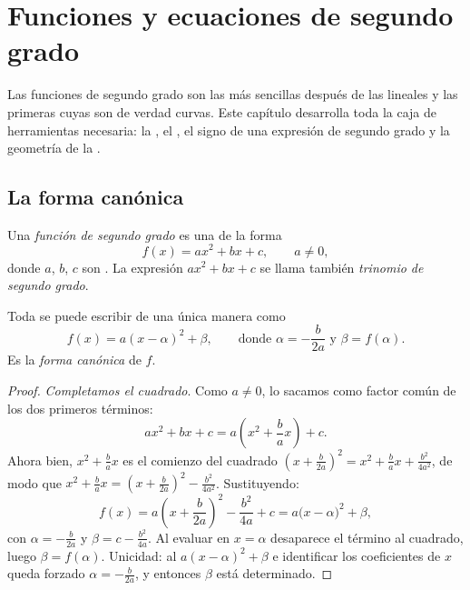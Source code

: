\chapter{Funciones y ecuaciones de segundo grado}\label{ch:g11:quad}

Las funciones de segundo grado son las más sencillas después de las
lineales y las primeras cuyas  son de verdad curvas. Este capítulo
desarrolla toda la caja de herramientas necesaria: la , el
, el signo de una expresión de segundo grado y la geometría
de la .

\section{La forma canónica}

\begin{definition}\label{def:g11:quad:quadratic}
Una \emph{función de segundo grado} es una
 de la forma
\[
f(x) = ax^2 + bx + c, \qquad a \neq 0,
\]
donde $a$, $b$, $c$ son . La expresión $ax^2 + bx + c$ se
llama también \emph{trinomio de segundo grado}.
\end{definition}

\begin{theorem}\label{thm:g11:quad:canonical}
Toda  se puede escribir de una única manera como
\[
f(x) = a(x - \alpha)^2 + \beta,
\qquad\text{donde } \alpha = -\frac{b}{2a} \text{ y } \beta = f(\alpha).
\]
Es la \emph{forma canónica} de $f$.
\end{theorem}

\begin{proof}
\emph{Completamos el cuadrado}. Como $a \neq 0$, lo sacamos como factor
común de los dos primeros términos:
\[
ax^2 + bx + c = a\left(x^2 + \frac{b}{a}x\right) + c .
\]
Ahora bien, $x^2 + \frac{b}{a}x$ es el comienzo del cuadrado
$\left(x + \frac{b}{2a}\right)^2 = x^2 + \frac ba x + \frac{b^2}{4a^2}$,
de modo que $x^2 + \frac{b}{a}x = \left(x + \frac{b}{2a}\right)^2 -
\frac{b^2}{4a^2}$. Sustituyendo:
\[
f(x) = a\left(x + \frac{b}{2a}\right)^2 - \frac{b^2}{4a} + c
= a\bigl(x - \alpha\bigr)^2 + \beta,
\]
con $\alpha = -\frac{b}{2a}$ y $\beta = c - \frac{b^2}{4a}$. Al evaluar en
$x = \alpha$ desaparece el término al cuadrado, luego $\beta = f(\alpha)$.
Unicidad: al  $a(x-\alpha)^2 + \beta$ e identificar los
coeficientes de $x$ queda forzado $\alpha = -\frac{b}{2a}$, y entonces
$\beta$ está determinado.
\end{proof}

